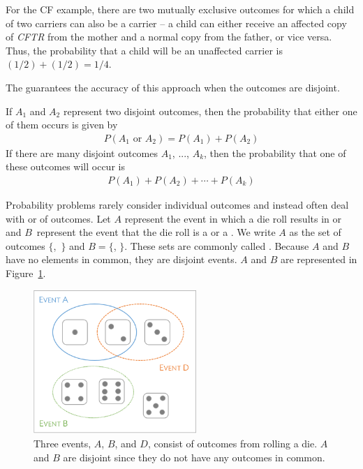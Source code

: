 \begin{doublespace}
For the CF example, there are two mutually exclusive outcomes for which a child of two carriers can also be a carrier -- a child can either receive an affected copy of \textit{CFTR} from the mother and a normal copy from the father, or vice versa. Thus, the probability that a child will be an unaffected carrier is $(1/2) + (1/2) = 1/4$.

The  guarantees the accuracy of this approach when the outcomes are disjoint. 

\begin{termBox}{ If $A_1$ and $A_2$ represent two disjoint outcomes, then the probability that either one of them occurs is given by
\begin{eqnarray*}
P(A_1\text{ or } A_2) = P(A_1) + P(A_2)
\end{eqnarray*}
If there are many disjoint outcomes $A_1$, ..., $A_k$, then the probability that one of these outcomes will occur is
\begin{eqnarray}
P(A_1) + P(A_2) + \cdots + P(A_k)
\end{eqnarray}
}
\end{termBox}



Probability problems rarely consider individual outcomes and instead often deal with  or  of outcomes. Let $A$ represent the event in which a die roll results in  or  and $B$~represent the event that the die roll is a  or a . We write $A$ as the set of outcomes $\{$,~$\}$ and $B=\{$, $\}$. These sets are commonly called . Because $A$ and $B$ have no elements in common, they are disjoint events. $A$ and $B$ are represented in Figure~\ref{fig:disjointEvents}.

\begin{figure}[hhh]
\centering
\includegraphics[width=0.55\textwidth]{ch_probability_oi_biostat/figures/disjointEvents/disjointEvents.png}
\caption{Three events, $A$, $B$, and $D$, consist of outcomes from rolling a die. $A$ and $B$ are disjoint since they do not have any outcomes in common.}
\label{fig:disjointEvents}
\end{figure}


\end{doublespace}
